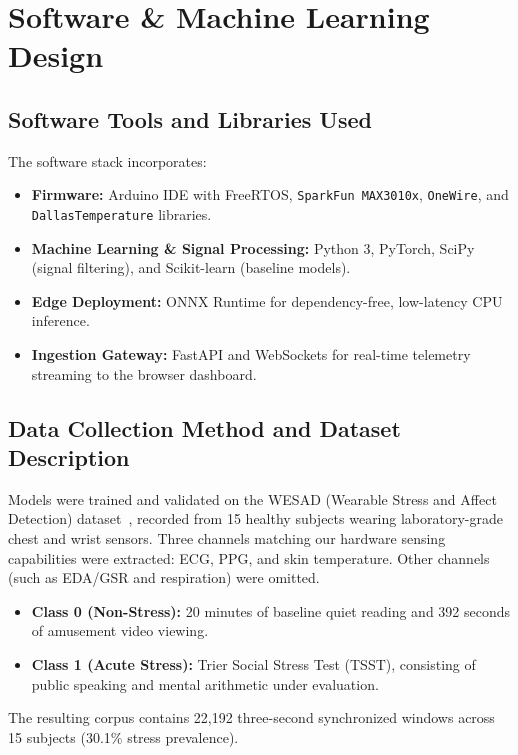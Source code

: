 \documentclass[11pt,a4paper]{article}
\begin{document}
\section{Software \& Machine Learning Design}

\subsection{Software Tools and Libraries Used}
The software stack incorporates:
\begin{itemize}
    \item \textbf{Firmware:} Arduino IDE with FreeRTOS, \texttt{SparkFun MAX3010x}, \texttt{OneWire}, and \texttt{DallasTemperature} libraries.
    \item \textbf{Machine Learning \& Signal Processing:} Python 3, PyTorch, SciPy (signal filtering), and Scikit-learn (baseline models).
    \item \textbf{Edge Deployment:} ONNX Runtime for dependency-free, low-latency CPU inference.
    \item \textbf{Ingestion Gateway:} FastAPI and WebSockets for real-time telemetry streaming to the browser dashboard.
\end{itemize}

\subsection{Data Collection Method and Dataset Description}
Models were trained and validated on the WESAD (Wearable Stress and Affect Detection) dataset~\cite{schmidt2018wesad}, recorded from 15 healthy subjects wearing laboratory-grade chest and wrist sensors. Three channels matching our hardware sensing capabilities were extracted: ECG, PPG, and skin temperature. Other channels (such as EDA/GSR and respiration) were omitted.
\begin{itemize}
    \item \textbf{Class 0 (Non-Stress):} 20 minutes of baseline quiet reading and 392 seconds of amusement video viewing.
    \item \textbf{Class 1 (Acute Stress):} Trier Social Stress Test (TSST), consisting of public speaking and mental arithmetic under evaluation.
\end{itemize}
The resulting corpus contains 22,192 three-second synchronized windows across 15 subjects (30.1\% stress prevalence).
\end{document}
